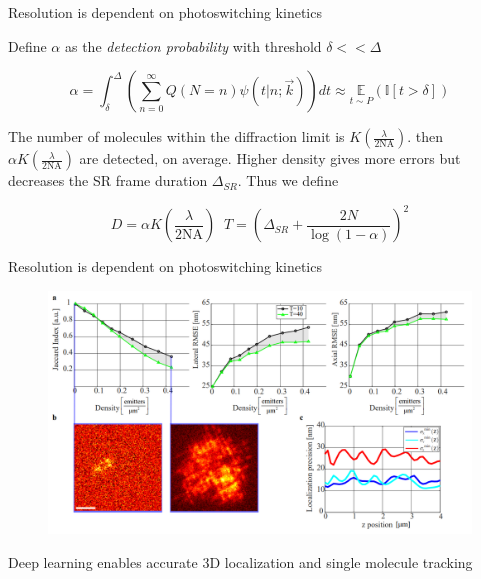\documentclass{beamer}					%
\begin{document}
\begin{frame}{Resolution is dependent on photoswitching kinetics}

Define $\alpha$ as the \emph{detection probability} with threshold $\delta << \Delta$

\begin{equation*}
\alpha = \int_{\delta}^{\Delta}\left(\sum_{n=0}^{\infty}Q(N=n)\psi(t|n;\vec{k})\right)dt \approx \underset{t\sim P}{\mathbb{E}}\left(\mathbb{I}[t > \delta]\right)
\end{equation*}

The number of molecules within the diffraction limit is $K\left(\frac{\lambda}{2\mathrm{NA}}\right)$. then $\alpha K\left(\frac{\lambda}{2\mathrm{NA}}\right)$ are detected, on average. Higher density gives more errors but decreases the SR frame duration $\Delta_{SR}$. Thus we define

\begin{equation*}
D = \alpha K\left(\frac{\lambda}{2\mathrm{NA}}\right)\;\; T = \left(\Delta_{SR}+\frac{2N}{\log(1-\alpha)}\right)^{2}
\end{equation*}

\end{frame}

\begin{frame}{Resolution is dependent on photoswitching kinetics}
\begin{figure}
\includegraphics[width=12cm]{Jaccard.png}
\end{figure}
\end{frame}



\begin{frame}{Deep learning enables accurate 3D localization and single molecule tracking}

\end{frame}
\end{document}
